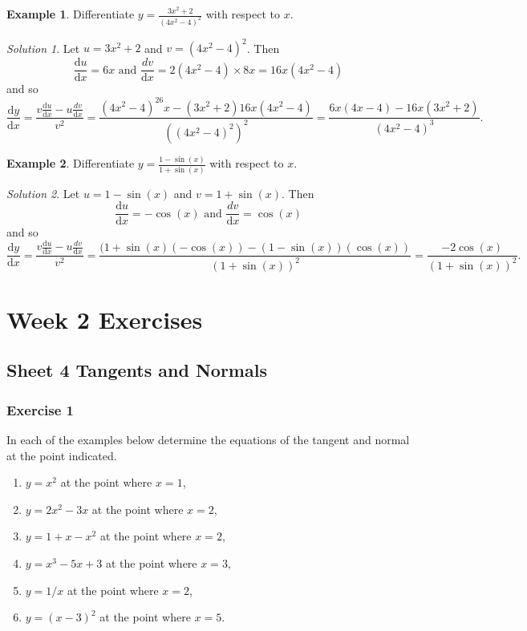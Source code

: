 \documentclass[
  11pt,
  oneside]{book}
\providecommand{\tightlist}{%
  \setlength{\itemsep}{0pt}\setlength{\parskip}{0pt}}
\theoremstyle{definition}
\theoremstyle{definition}
\newtheorem{example}{Example}[chapter]
\theoremstyle{definition}
\theoremstyle{definition}
\theoremstyle{remark}
\newtheorem*{solution}{Solution}
\begin{document}
\begin{example}
Differentiate \(y=\frac{3x^2+2}{(4x^2-4)^2}\) with respect to \(x\).
\end{example}

\begin{solution}
Let \(u = 3x^2+2\) and \(v = (4x^2-4)^2\).
Then
\[
\frac{\mathrm{d} u}{\mathrm{d} x} = 6x\text{ and }\frac{dv}{\mathrm{d} x} = 2(4x^2-4)\times8x = 16x(4x^2-4)
\]
and so
\[
\frac{\mathrm{d} y}{\mathrm{d} x} = \frac{v\frac{\mathrm{d} u}{\mathrm{d} x}-u\frac{dv}{\mathrm{d} x}}{v^2} = \frac{(4x^2-4)^26x - (3x^2+2)16x(4x^2-4)}{((4x^2-4)^2)^2} = \frac{6x(4x-4)-16x(3x^2+2)}{(4x^2-4)^3}.
\]
\end{solution}

\begin{example}
Differentiate \(y=\frac{1-\sin(x)}{1+\sin(x)}\) with respect to \(x\).
\end{example}

\begin{solution}
Let \(u = 1-\sin(x)\) and \(v = 1+\sin(x)\).
Then
\[
\frac{\mathrm{d} u}{\mathrm{d} x} = -\cos(x)\text{ and }\frac{dv}{\mathrm{d} x} = \cos(x) 
\]
and so
\[
\frac{\mathrm{d} y}{\mathrm{d} x} = \frac{v\frac{\mathrm{d} u}{\mathrm{d} x}-u\frac{dv}{\mathrm{d} x}}{v^2} = \frac{(1+\sin(x)(-\cos(x))-(1-\sin(x))(\cos(x))}{(1+\sin(x))^2} = \frac{-2\cos(x)}{(1+\sin(x))^2}.
\]
\end{solution}

\chapter*{Week 2 Exercises}\label{week-2-exercises}

\section{Sheet 4 Tangents and Normals}\label{sheet-4-tangents-and-normals}

\subsection*{Exercise 1}\label{exercise-1-1}

In each of the examples below determine the equations of the tangent and normal at the point indicated.

\begin{enumerate}
\def\labelenumi{\alph{enumi}.}
\tightlist
\item
  \(y=x^2\) at the point where \(x=1\),
\item
  \(y=2x^2-3x\) at the point where \(x=2\),
\item
  \(y=1+x-x^2\) at the point where \(x=2\),
\item
  \(y=x^3-5x+3\) at the point where \(x=3\),
\item
  \(y=1/x\) at the point where \(x=2\),
\item
  \(y=(x-3)^2\) at the point where \(x=5\).
\end{enumerate}
\end{document}
